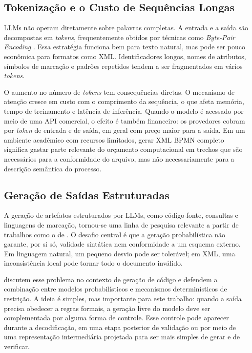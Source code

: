 \subsection{Tokenização e o Custo de Sequências Longas}
\label{subsec:tokenizacao}

LLMs não operam diretamente sobre palavras completas. A entrada e a saída são decompostas em \textit{tokens}, frequentemente obtidos por técnicas como \textit{Byte-Pair Encoding} \cite{sennrich2016neural}. Essa estratégia funciona bem para texto natural, mas pode ser pouco econômica para formatos como XML. Identificadores longos, nomes de atributos, símbolos de marcação e padrões repetidos tendem a ser fragmentados em vários \textit{tokens}.

O aumento no número de \textit{tokens} tem consequências diretas. O mecanismo de atenção cresce em custo com o comprimento da sequência, o que afeta memória, tempo de treinamento e latência de inferência. Quando o modelo é acessado por meio de uma API comercial, o efeito é também financeiro: os provedores cobram por \textit{token} de entrada e de saída, em geral com preço maior para a saída. Em um ambiente acadêmico com recursos limitados, gerar XML BPMN completo significa gastar parte relevante do orçamento computacional em trechos que são necessários para a conformidade do arquivo, mas não necessariamente para a descrição semântica do processo.

\subsection{Geração de Saídas Estruturadas}
\label{subsec:saidas-estruturadas}

A geração de artefatos estruturados por LLMs, como código-fonte, consultas e linguagens de marcação, tornou-se uma linha de pesquisa relevante a partir de trabalhos como o de . O desafio central é que a geração probabilística não garante, por si só, validade sintática nem conformidade a um esquema externo. Em linguagem natural, um pequeno desvio pode ser tolerável; em XML, uma inconsistência local pode tornar todo o documento inválido.

 discutem esse problema no contexto de geração de código e defendem a combinação entre modelos probabilísticos e mecanismos determinísticos de restrição. A ideia é simples, mas importante para este trabalho: quando a saída precisa obedecer a regras formais, a geração livre do modelo deve ser complementada por alguma forma de controle. Esse controle pode aparecer durante a decodificação, em uma etapa posterior de validação ou por meio de uma representação intermediária projetada para ser mais simples de gerar e de verificar.

